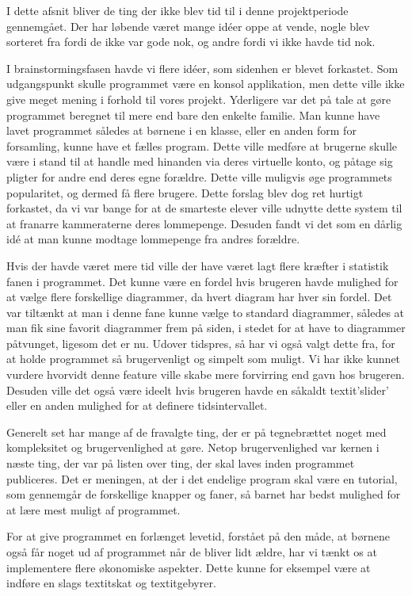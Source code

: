 I dette afsnit bliver de ting der ikke blev tid til i denne projektperiode gennemgået. Der har løbende været mange idéer oppe at vende, nogle blev sorteret fra fordi de ikke var gode nok, og andre fordi vi ikke havde tid nok. 

I brainstormingsfasen havde vi flere idéer, som sidenhen er blevet forkastet. Som udgangspunkt skulle programmet være en konsol applikation, men dette ville ikke give meget mening i forhold til vores projekt. Yderligere var det på tale at gøre programmet beregnet til mere end bare den enkelte familie. Man kunne have lavet programmet således at børnene i en klasse, eller en anden form for forsamling, kunne have et fælles program. Dette ville medføre at brugerne skulle være i stand til at handle med hinanden via deres virtuelle konto, og påtage sig pligter for andre end deres egne forældre. Dette ville muligvis øge programmets popularitet, og dermed få flere brugere. Dette forslag blev dog ret hurtigt forkastet, da vi var bange for at de smarteste elever ville udnytte dette system til at franarre kammeraterne deres lommepenge. Desuden fandt vi det som en dårlig idé at man kunne modtage lommepenge fra andres forældre.

Hvis der havde været mere tid ville der have været lagt flere kræfter i statistik fanen i programmet. Det kunne være en fordel hvis brugeren havde mulighed for at vælge flere forskellige diagrammer, da hvert diagram har hver sin fordel. Det var tiltænkt at man i denne fane kunne vælge to standard diagrammer, således at man fik sine favorit diagrammer frem på siden, i stedet for at have to diagrammer påtvunget, ligesom det er nu. Udover tidspres, så har vi også valgt dette fra, for at holde programmet så brugervenligt og simpelt som muligt. Vi har ikke kunnet vurdere hvorvidt denne feature ville skabe mere forvirring end gavn hos brugeren. Desuden ville det også være ideelt hvis brugeren havde en såkaldt textit{'slider'} eller en anden mulighed for at definere tidsintervallet.

Generelt set har mange af de fravalgte ting, der er på tegnebrættet noget med kompleksitet og brugervenlighed at gøre. Netop brugervenlighed var kernen i næste ting, der var på listen over ting, der skal laves inden programmet publiceres. Det er meningen, at der i det endelige program skal være en tutorial, som gennemgår de forskellige knapper og faner, så barnet har bedst mulighed for at lære mest muligt af programmet.

For at give programmet en forlænget levetid, forstået på den måde, at børnene også får noget ud af programmet når de bliver lidt ældre, har vi tænkt os at implementere flere økonomiske aspekter. Dette kunne for eksempel være at indføre en slags textit{skat} og textit{gebyrer}.

